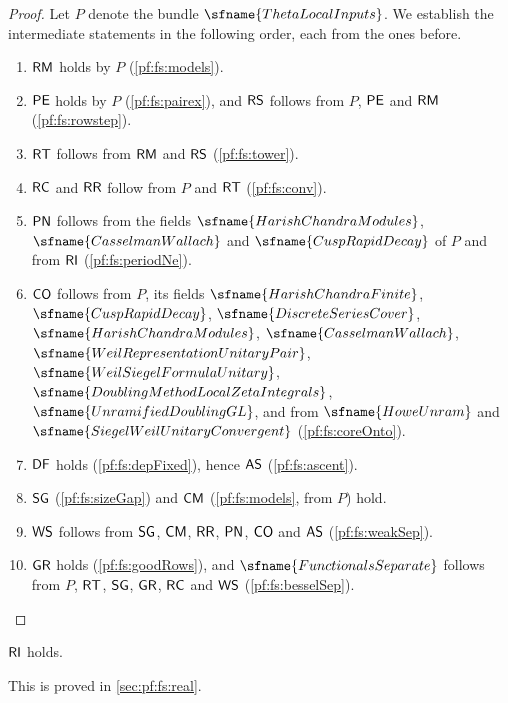 \begin{proof}\sloppy
Let $P$ denote the bundle $\sfname{ThetaLocalInputs}$. We establish the intermediate statements in the following order, each
from the ones before.
\begin{enumerate}[label=(\alph*)]
\item $\mathsf{RM}$ holds by $P$ (\cref{pf:fs:models}).
\item $\mathsf{PE}$ holds by $P$ (\cref{pf:fs:pairex}), and $\mathsf{RS}$ follows from $P$, $\mathsf{PE}$ and $\mathsf{RM}$ (\cref{pf:fs:rowstep}).
\item $\mathsf{RT}$ follows from $\mathsf{RM}$ and $\mathsf{RS}$ (\cref{pf:fs:tower}).
\item $\mathsf{RC}$ and $\mathsf{RR}$ follow from $P$ and $\mathsf{RT}$ (\cref{pf:fs:conv}).
\item $\mathsf{PN}$ follows from the fields $\sfname{HarishChandraModules}$, $\sfname{CasselmanWallach}$ and $\sfname{CuspRapidDecay}$ of
$P$ and from $\mathsf{RI}$ (\cref{pf:fs:periodNe}).
\item $\mathsf{CO}$ follows from $P$, its fields $\sfname{HarishChandraFinite}$, $\sfname{CuspRapidDecay}$,
$\sfname{DiscreteSeriesCover}$, $\sfname{HarishChandraModules}$, $\sfname{CasselmanWallach}$, $\sfname{WeilRepresentationUnitaryPair}$,
$\sfname{WeilSiegelFormulaUnitary}$, $\sfname{DoublingMethodLocalZetaIntegrals}$, $\sfname{UnramifiedDoublingGL}$, and from
$\sfname{HoweUnram}$ and $\sfname{SiegelWeilUnitaryConvergent}$ (\cref{pf:fs:coreOnto}).
\item $\mathsf{DF}$ holds (\cref{pf:fs:depFixed}), hence $\mathsf{AS}$ (\cref{pf:fs:ascent}).
\item $\mathsf{SG}$ (\cref{pf:fs:sizeGap}) and $\mathsf{CM}$ (\cref{pf:fs:models}, from $P$) hold.
\item $\mathsf{WS}$ follows from $\mathsf{SG}$, $\mathsf{CM}$, $\mathsf{RR}$, $\mathsf{PN}$, $\mathsf{CO}$ and $\mathsf{AS}$ (\cref{pf:fs:weakSep}).
\item $\mathsf{GR}$ holds (\cref{pf:fs:goodRows}), and $\sfname{FunctionalsSeparate}$ follows from $P$, $\mathsf{RT}$, $\mathsf{SG}$,
$\mathsf{GR}$, $\mathsf{RC}$ and $\mathsf{WS}$ (\cref{pf:fs:besselSep}).\qedhere
\end{enumerate}
\end{proof}

\begin{theorem}\label{pf:fs:RIholds}
$\mathsf{RI}$ holds.
\end{theorem}

This is proved in \cref{sec:pf:fs:real}.

